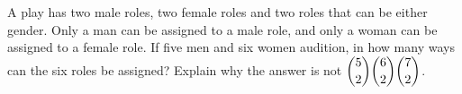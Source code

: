 A play has two male roles, two female roles and two roles that can be either gender. Only a man can be assigned to a male role, and only a woman can be assigned to a female role. If five men and six women audition, in how many ways can the six roles be assigned? Explain why the answer is not $\dbinom52\dbinom62\dbinom72$.
